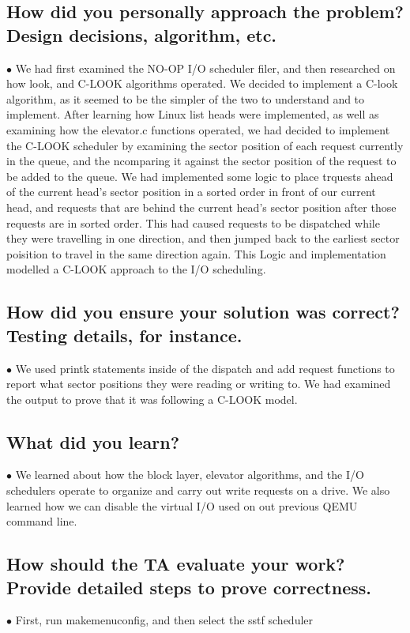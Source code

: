 \documentclass[letterpaper,10pt,fleqn,draftclsnofoot,onecolumn]{IEEEtran}
\begin{document}
	\subsection{How did you personally approach the problem? Design decisions, algorithm, etc.}
	$\bullet$ We had first examined the NO-OP I/O scheduler filer, and then researched on how look, and C-LOOK algorithms operated. We decided to implement a C-look algorithm, as it seemed to be the simpler of the two to understand and to implement. After learning how Linux list heads were implemented, as well as examining how the elevator.c functions operated, we had decided to implement the C-LOOK scheduler by examining the sector position of each request currently in the queue, and the ncomparing it against the sector position of the request to be added to the queue. We had implemented some logic to place trquests ahead of the current head's sector position in a sorted order in front of our current head, and requests that are behind the current head's sector position after those requests are in sorted order. This had caused requests to be dispatched while they were travelling in one direction, and then jumped back to the earliest sector poisition to travel in the same direction again. This Logic and implementation modelled a C-LOOK approach to the I/O scheduling.
	
	
	\subsection{How did you ensure your solution was correct? Testing details, for instance.}
	$\bullet$ We used printk statements inside of the dispatch and add request functions to report what sector positions they were reading or writing to. We had examined the output to prove that it was following a C-LOOK model.
	
	\subsection{What did you learn?}
	$\bullet$ We learned about how the block layer, elevator algorithms, and the I/O schedulers operate to organize and carry out write requests on a drive. We also learned how we can disable the virtual I/O used on out previous QEMU command line.
	
	\subsection{How should the TA evaluate your work? Provide detailed steps to prove correctness.}
	$\bullet$ First, run makemenuconfig, and then select the sstf scheduler
	
\end{document}
